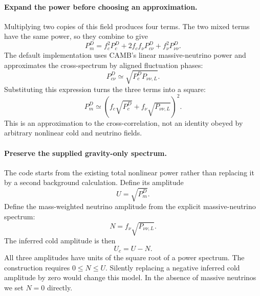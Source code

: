 \documentclass[11pt]{article}
\begin{document}
\paragraph{Expand the power before choosing an approximation.}
Multiplying two copies of this field produces four terms. The two mixed
terms have the same power, so they combine to give
\begin{equation}
 P_m^D=f_c^2P_c^D+2f_cf_\nu P_{c\nu}^D+f_\nu^2P_{\nu\nu}^D.
\end{equation}
The default implementation uses CAMB's linear massive-neutrino power and
approximates the cross-spectrum by aligned fluctuation phases:
\begin{equation}
 P_{c\nu}^D\simeq\sqrt{P_c^D P_{\nu\nu,L}}.
\end{equation}
Substituting this expression turns the three terms into a square:
\begin{equation}
 P_m^D\simeq
 \left(f_c\sqrt{P_c^D}+f_\nu\sqrt{P_{\nu\nu,L}}\right)^2.
\end{equation}
This is an approximation to the cross-correlation, not an identity obeyed
by arbitrary nonlinear cold and neutrino fields.

\paragraph{Preserve the supplied gravity-only spectrum.}
The code starts from the existing total nonlinear power rather than
replacing it by a second background calculation. Define its amplitude
\begin{equation}
 U=\sqrt{P_m^D}.
\end{equation}
Define the mass-weighted neutrino amplitude from the explicit massive-neutrino
spectrum:
\begin{equation}
 N=f_\nu\sqrt{P_{\nu\nu,L}}.
\end{equation}
The inferred cold amplitude is then
\begin{equation}
 U_c=U-N.
\end{equation}
All three amplitudes have units of the square root of a power spectrum.
The construction requires $0\leq N\leq U$. Silently replacing a negative
inferred cold amplitude by zero would change this model. In the absence
of massive neutrinos we set $N=0$ directly.
\end{document}
